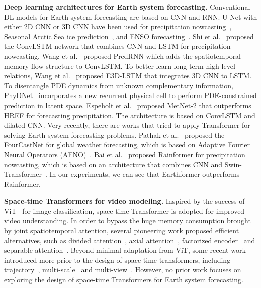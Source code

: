 \documentclass{article}
\renewcommand{\paragraph}[1]{\textbf{#1. }}
\begin{document}
\paragraph{Deep learning architectures for Earth system forecasting}
Conventional DL models for Earth system forecasting are based on CNN and RNN. U-Net with either 2D CNN or 3D CNN have been used for precipitation nowcasting~\cite{veillette2020sevir},  Seasonal Arctic Sea ice prediction~\cite{andersson2021seasonal}, and ENSO forecasting~\cite{ham2019deep}. Shi et al.~\cite{shi2015convolutional} proposed the ConvLSTM network that combines CNN and LSTM for precipitation nowcasting. Wang et al.~\cite{wang2022predrnn} proposed PredRNN which adds the spatiotemporal memory flow structure to ConvLSTM. To better learn long-term high-level relations, Wang et al.~\cite{wang2018eidetic} proposed E3D-LSTM that integrates 3D CNN to LSTM. To disentangle PDE dynamics from unknown complementary information, PhyDNet~\cite{guen2020disentangling} incorporates a new recurrent physical cell to perform PDE-constrained prediction in latent space.  Espeholt et al.~\cite{espeholt2021skillful} proposed MetNet-2 that outperforms HREF for forecasting precipitation. The architecture is based on ConvLSTM and dilated CNN. Very recently, there are works that tried to apply Transformer for solving Earth system forecasting problems. Pathak et al.~\cite{pathak2022fourcastnet} proposed the FourCastNet for global weather forecasting, which is based on Adaptive Fourier Neural Operators (AFNO)~\cite{guibas2021adaptive}. Bai et al.~\cite{bai2022rainformer} proposed Rainformer for precipitation nowcasting, which is based on an architecture that combines CNN and Swin-Transformer~\cite{liu2021swin}. In our experiments, we can see that Earthformer outperforms Rainformer.

\paragraph{Space-time Transformers for video modeling}
Inspired by the success of ViT~\cite{dosovitskiy2020image} for image classification, space-time Transformer is adopted for improved video understanding.
In order to bypass the huge memory consumption brought by joint spatiotemporal attention, several pioneering work proposed efficient alternatives, such as divided attention~\cite{bertasius2021space}, axial attention~\cite{ho2019axial,bertasius2021space}, factorized encoder~\cite{neimark2021video,arnab2021vivit} and separable attention~\cite{zhang2021vidtr}. 
Beyond minimal adaptation from ViT, some recent work introduced more prior to the design of space-time transformers, including trajectory~\cite{patrick2021keeping}, multi-scale~\cite{liu2021video,fan2021multiscale} and multi-view~\cite{yan2022multiview}. However, no prior work focuses on exploring the design of space-time Transformers for Earth system forecasting.
\end{document}
